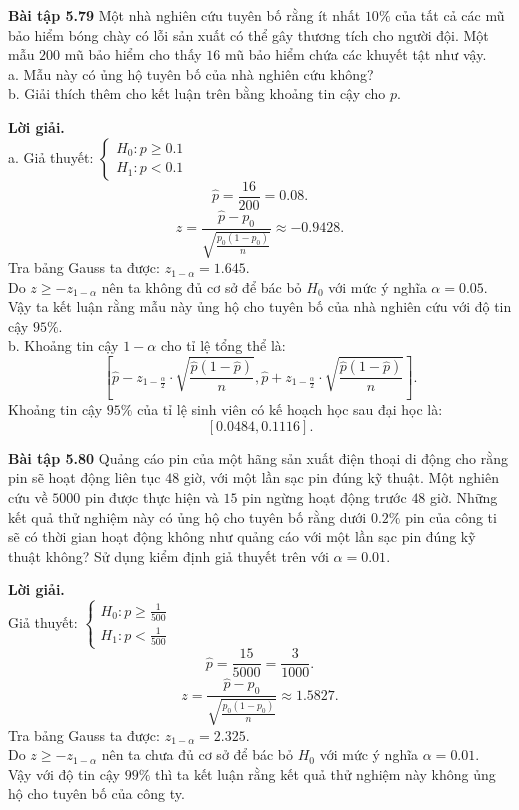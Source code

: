\begin{mybox}
\textbf{Bài tập 5.79} Một nhà nghiên cứu tuyên bố rằng ít nhất $10\%$ của tất cả các mũ bảo hiểm bóng chày có lỗi sản xuất có thể gây thương tích cho người đội. Một mẫu $200$ mũ bảo hiểm cho thấy $16$ mũ bảo hiểm chứa các khuyết tật như vậy.\\
a. Mẫu này có ủng hộ tuyên bố của nhà nghiên cứu không?\\
b. Giải thích thêm cho kết luận trên bằng khoảng tin cậy cho $p.$
\end{mybox}
\textbf{Lời giải.}\\
a. Giả thuyết: $\begin{cases}
H_0: p \geqslant 0.1\\
H_1: p < 0.1
\end{cases}$\\
$$\widehat{p} = \frac{16}{200} = 0.08.$$
$$z = \frac{{\widehat p - {p_0}}}{{\sqrt {\frac{{{p_0}\left( {1 - {p_0}} \right)}}{n}} }} \approx  -0.9428.$$
Tra bảng Gauss ta được: $z_{1 - \alpha} = 1.645.$\\
Do $z \geqslant - z_{1 - \alpha}$ nên ta không đủ cơ sở để bác bỏ $H_0$ với mức ý nghĩa $\alpha = 0.05.$\\
Vậy ta kết luận rằng mẫu này ủng hộ cho tuyên bố của nhà nghiên cứu với độ tin cậy $95\%.$\\
b. Khoảng tin cậy $1 - \alpha$ cho tỉ lệ tổng thể là:
$$\left[ {\widehat{p} - z_{1 - \frac{\alpha}{2}} \cdot \sqrt{\frac{\widehat{p} \left( {1 - \widehat{p}} \right)}{n}}, \widehat{p} + z_{1 - \frac{\alpha}{2}} \cdot \sqrt{\frac{\widehat{p} \left( {1 - \widehat{p}} \right)}{n}}} \right].$$
Khoảng tin cậy $95\%$ của tỉ lệ sinh viên có kế hoạch học sau đại học là:
$$\left[ {0.0484, 0.1116} \right].$$

\begin{mybox}
\textbf{Bài tập 5.80} Quảng cáo pin của một hãng sản xuất điện thoại di động cho rằng pin sẽ hoạt động liên tục $48$ giờ, với một lần sạc pin đúng kỹ thuật. Một nghiên cứu về $5000$ pin được thực hiện và $15$ pin ngừng hoạt động trước $48$ giờ. Những kết quả thử nghiệm này có ủng hộ cho tuyên bố rằng dưới $0.2\%$ pin của công ti sẽ có thời gian hoạt động không như quảng cáo với một lần sạc pin đúng kỹ thuật không? Sử dụng kiểm định giả thuyết trên với $\alpha = 0.01.$
\end{mybox}
\textbf{Lời giải.}\\
Giả thuyết: $\begin{cases}
H_0: p \geqslant \frac{1}{500}\\
H_1: p < \frac{1}{500}
\end{cases}$\\
$$\widehat{p} = \frac{15}{5000} = \frac{3}{1000}.$$
$$z = \frac{{\widehat p - {p_0}}}{{\sqrt {\frac{{{p_0}\left( {1 - {p_0}} \right)}}{n}} }} \approx 1.5827.$$
Tra bảng Gauss ta được: $z_{1 - \alpha} = 2.325.$\\
Do $z \geqslant - z_{1 - \alpha}$ nên ta chưa đủ cơ sở để bác bỏ $H_0$ với mức ý nghĩa $\alpha = 0.01.$\\
Vậy với độ tin cậy $99\%$ thì ta kết luận rằng kết quả thử nghiệm này không ủng hộ cho tuyên bố của công ty.

